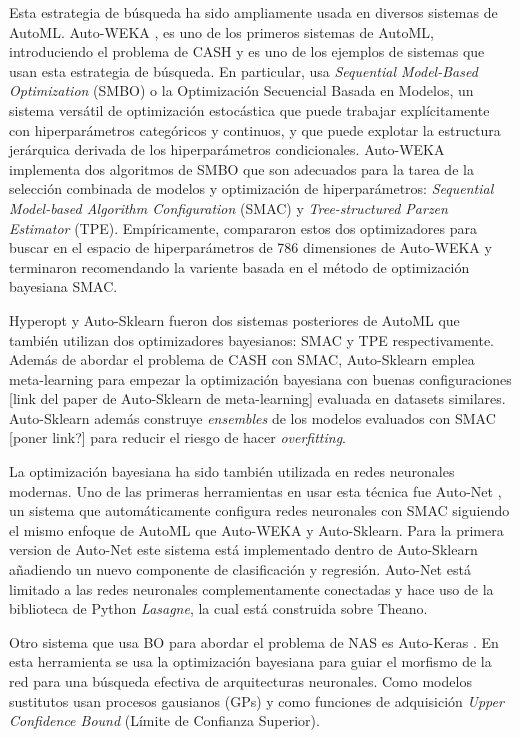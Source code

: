Esta estrategia de búsqueda ha sido ampliamente usada en diversos sistemas de AutoML. Auto-WEKA \cite{thornton2013auto}, es uno de los primeros sistemas de AutoML, introduciendo el problema de CASH y es uno de los ejemplos de sistemas que usan esta estrategia de búsqueda. En particular, usa \textit{Sequential Model-Based Optimization} (SMBO) o la Optimización Secuencial Basada en Modelos, un sistema versátil de optimización estocástica que puede trabajar explícitamente con hiperparámetros categóricos y continuos, y que puede explotar la estructura jerárquica derivada de los hiperparámetros condicionales. Auto-WEKA implementa dos algoritmos de SMBO que son adecuados para la tarea de la selección combinada de modelos y optimización de hiperparámetros: \textit{Sequential Model-based Algorithm Configuration} (SMAC) y \textit{Tree-structured Parzen Estimator} (TPE). Empíricamente, compararon estos dos optimizadores para buscar en el espacio de hiperparámetros de 786 dimensiones de Auto-WEKA y terminaron recomendando la variente basada en el método de optimización bayesiana SMAC.

Hyperopt \cite{bergstra2013hyperopt} y Auto-Sklearn \cite{fuerer2015efficient} fueron dos sistemas posteriores de AutoML que también utilizan dos optimizadores bayesianos: SMAC y TPE respectivamente. Además de abordar el problema de CASH con SMAC, Auto-Sklearn emplea meta-learning para empezar la optimización bayesiana con buenas configuraciones [link del paper de Auto-Sklearn de meta-learning] evaluada en datasets similares. Auto-Sklearn además construye \textit{ensembles} de los modelos evaluados con SMAC [poner link?] para reducir el riesgo de hacer \textit{overfitting}.

La optimización bayesiana ha sido también utilizada en redes neuronales modernas. Uno de las primeras herramientas en usar esta técnica fue Auto-Net \cite{mendoza2016towards}, un sistema que automáticamente configura redes neuronales con SMAC siguiendo el mismo enfoque de AutoML que Auto-WEKA y Auto-Sklearn. Para la primera version de Auto-Net este sistema está implementado dentro de Auto-Sklearn añadiendo un nuevo componente de clasificación y regresión. Auto-Net está limitado a las redes neuronales complementamente conectadas y hace uso de la biblioteca de Python \textit{Lasagne}, la cual está construida sobre Theano.

Otro sistema que usa BO para abordar el problema de NAS es Auto-Keras \cite{jin2019auto}. En esta herramienta se usa la optimización bayesiana para guiar el morfismo de la red para una búsqueda efectiva de arquitecturas neuronales. Como modelos sustitutos usan procesos gausianos (GPs) y como funciones de adquisición \textit{Upper Confidence Bound} (Límite de Confianza Superior).

